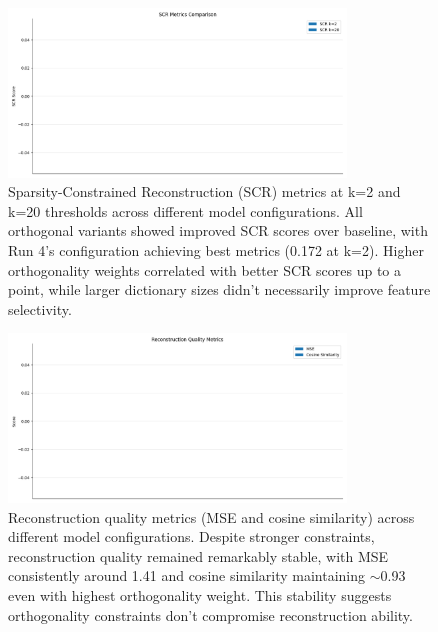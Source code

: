 \documentclass{article} %
\begin{document}
\begin{figure}[h]
    \centering
    \includegraphics[width=0.8\textwidth]{scr_comparison.png}
    \caption{Sparsity-Constrained Reconstruction (SCR) metrics at k=2 and k=20 thresholds across different model configurations. All orthogonal variants showed improved SCR scores over baseline, with Run 4's configuration achieving best metrics (0.172 at k=2). Higher orthogonality weights correlated with better SCR scores up to a point, while larger dictionary sizes didn't necessarily improve feature selectivity.}
    \label{fig:scr_comparison}
\end{figure}

\begin{figure}[h]
    \centering
    \includegraphics[width=0.8\textwidth]{reconstruction_quality.png}
    \caption{Reconstruction quality metrics (MSE and cosine similarity) across different model configurations. Despite stronger constraints, reconstruction quality remained remarkably stable, with MSE consistently around 1.41 and cosine similarity maintaining $\sim$0.93 even with highest orthogonality weight. This stability suggests orthogonality constraints don't compromise reconstruction ability.}
    \label{fig:reconstruction_quality}
\end{figure}
\end{document}
